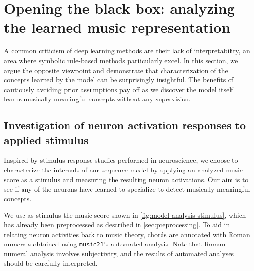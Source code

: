 \chapter{Opening the black box: analyzing the learned music representation}\label{sec:model-analysis}
\ifpdf
    \graphicspath{{Chapter5/Figs/Raster/}{Chapter5/Figs/PDF/}{Chapter5/Figs/}}
\else
    \graphicspath{{Chapter5/Figs/Vector/}{Chapter5/Figs/}}
\fi

A common criticism of deep learning methods are their lack of interpretability,
an area where symbolic rule-based methods particularly excel. In this section,
we argue the opposite viewpoint and demonstrate that characterization of the
concepts learned by the model can be surprisingly insightful. The benefits of
cautiously avoiding prior assumptions pay off as we discover the model itself learns
musically meaningful concepts without any supervision.

\section{Investigation of neuron activation responses to applied stimulus}

Inspired by stimulus-response studies performed in neuroscience, we choose to
characterize the internals of our sequence model by applying an analyzed music
score as a stimulus and measuring the resulting neuron activations. Our aim
is to see if any of the neurons have learned to specialize to detect musically meaningful
concepts.

We use as stimulus the music score shown in \cref{fig:model-analysis-stimulus},
which has already been preprocessed as described in \vref{sec:preprocessing}.
To aid in relating neuron activities back to music theory, chords are annotated
with Roman numerals obtained using {\tt music21}'s automated analysis. Note
that Roman numeral analysis involves subjectivity, and the results of automated
analyses should be carefully interpreted.

